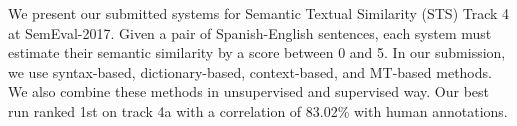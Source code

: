We present our submitted systems for Semantic Textual Similarity (STS) Track 4 at SemEval-2017. Given a pair of Spanish-English sentences, each system must estimate their semantic similarity by a score between 0 and 5. In our submission, we use syntax-based, dictionary-based, context-based, and MT-based methods. We also combine these methods in unsupervised and supervised way. Our best run ranked 1st on track 4a with a correlation of 83.02\% with human annotations.

